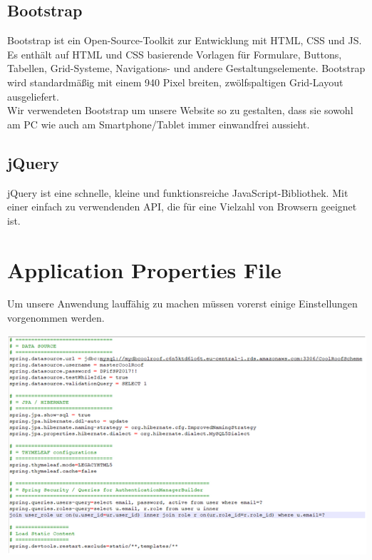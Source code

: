 \documentclass[12pt,a4paper]{article}
\begin{document}
\subsection{Bootstrap}
Bootstrap ist ein Open-Source-Toolkit zur Entwicklung mit HTML, CSS und JS. Es enthält auf HTML und CSS basierende Vorlagen für Formulare, Buttons, Tabellen, Grid-Systeme, Navigations- und andere Gestaltungselemente. Bootstrap wird standardmäßig mit einem 940 Pixel breiten, zwölfspaltigen Grid-Layout ausgeliefert.\\
Wir verwendeten Bootstrap um unsere Website so zu gestalten, dass sie sowohl am PC wie auch am Smartphone/Tablet immer einwandfrei aussieht. 


\subsection{jQuery}
jQuery ist eine schnelle, kleine und funktionsreiche JavaScript-Bibliothek. Mit einer einfach zu verwendenden API, die für eine Vielzahl von Browsern geeignet ist. 
\clearpage




\section{Application Properties File}
Um unsere Anwendung lauffähig zu machen müssen vorerst einige Einstellungen vorgenommen werden.

\hspace{-5em}\includegraphics[width=1.2\textwidth]{./Graphics/bild1}
\end{document}
